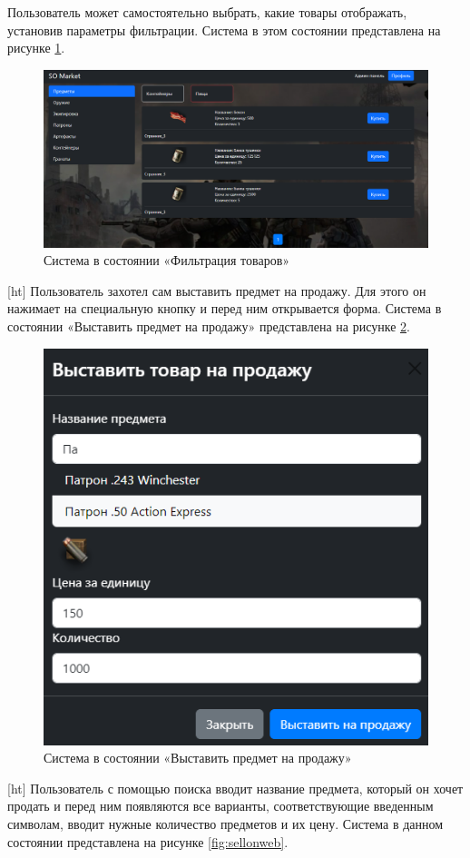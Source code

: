 Пользователь может самостоятельно выбрать, какие товары отображать, установив параметры фильтрации. Система в этом состоянии представлена на рисунке \ref{fig:shopsortweb}.

\begin{figure}[ht]
	\centering
	\includegraphics[width=0.7\linewidth]{images/shop_sort_web}
	\caption{Система в состоянии «Фильтрация товаров»}
	\label{fig:shopsortweb}
	
\end{figure}[ht]
Пользователь захотел сам выставить предмет на продажу. Для этого он нажимает на специальную кнопку и перед ним открывается форма. Система в состоянии «Выставить предмет на продажу» представлена на рисунке \ref{fig:sellweb}.

\begin{figure}[ht]
	\centering
	\includegraphics[width=0.6\linewidth]{images/sell_web}
	\caption{Система в состоянии «Выставить предмет на продажу»}
	\label{fig:sellweb}
	
\end{figure}[ht]
Пользователь с помощью поиска вводит название предмета, который он хочет продать и перед ним появляются все варианты, соответствующие введенным символам, вводит нужные количество предметов и их цену. Система в данном состоянии представлена на рисунке \ref{fig:sellonweb}.

